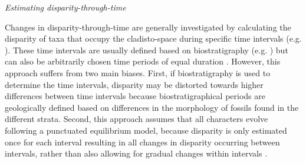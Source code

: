 \documentclass[12pt,letterpaper]{article}
\renewcommand{\subsection}[1]{%
\bigskip
\begin{center}
\begin{large}
\normalfont\itshape #1
\end{large}
\end{center}}
\begin{document}
\subsection{Estimating disparity-through-time} 
Changes in disparity-through-time are generally investigated by calculating the disparity of taxa that occupy the cladisto-space during specific time intervals (e.g. \cite{Brusatte12092008,bensonfaunal2014}).
These time intervals are usually defined based on biostratigraphy (e.g. \cite{Brusatte12092008}) but can also be arbitrarily chosen time periods of equal duration \cite{bensonfaunal2014}.
However, this approach suffers from two main biases. 
First, if biostratigraphy is used to determine the time intervals, disparity may be distorted towards higher differences between time intervals because biostratigraphical periods are geologically defined based on differences in the morphology of fossils found in the different strata.
Second, this approach assumes that all characters evolve following a punctuated equilibrium model, because disparity is only estimated once for each interval resulting in all changes in disparity occurring between intervals, rather than also allowing for gradual changes within intervals \cite{Hunt21042015}.
\end{document}
